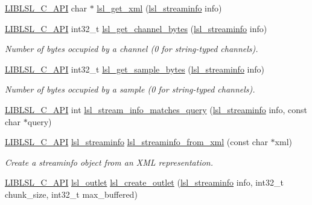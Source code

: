 \begin{DoxyCompactItemize}
\item 
\hyperlink{lsl__cpp_8h_aafd0ef1813e8be84a1420c4f1df64615}{L\+I\+B\+L\+S\+L\+\_\+\+C\+\_\+\+A\+PI} char $\ast$ \hyperlink{namespacelsl_ad1a9b14dccf565e5ecb79c093fe0fd39}{lsl\+\_\+get\+\_\+xml} (\hyperlink{namespacelsl_aa0a9ce9956061679949daa2e35aae2e8}{lsl\+\_\+streaminfo} info)
\item 
\hyperlink{lsl__cpp_8h_aafd0ef1813e8be84a1420c4f1df64615}{L\+I\+B\+L\+S\+L\+\_\+\+C\+\_\+\+A\+PI} int32\+\_\+t \hyperlink{namespacelsl_aa11d6865aa57caf51f5d13c66a785b30}{lsl\+\_\+get\+\_\+channel\+\_\+bytes} (\hyperlink{namespacelsl_aa0a9ce9956061679949daa2e35aae2e8}{lsl\+\_\+streaminfo} info)
\begin{DoxyCompactList}\small\item\em Number of bytes occupied by a channel (0 for string-\/typed channels). \end{DoxyCompactList}\item 
\hyperlink{lsl__cpp_8h_aafd0ef1813e8be84a1420c4f1df64615}{L\+I\+B\+L\+S\+L\+\_\+\+C\+\_\+\+A\+PI} int32\+\_\+t \hyperlink{namespacelsl_a26e8a9f4b8c7ee128362aadbc688dab0}{lsl\+\_\+get\+\_\+sample\+\_\+bytes} (\hyperlink{namespacelsl_aa0a9ce9956061679949daa2e35aae2e8}{lsl\+\_\+streaminfo} info)
\begin{DoxyCompactList}\small\item\em Number of bytes occupied by a sample (0 for string-\/typed channels). \end{DoxyCompactList}\item 
\hyperlink{lsl__cpp_8h_aafd0ef1813e8be84a1420c4f1df64615}{L\+I\+B\+L\+S\+L\+\_\+\+C\+\_\+\+A\+PI} int \hyperlink{namespacelsl_a5c10ba1783b34bd0b3f048ac4cb5fe5e}{lsl\+\_\+stream\+\_\+info\+\_\+matches\+\_\+query} (\hyperlink{namespacelsl_aa0a9ce9956061679949daa2e35aae2e8}{lsl\+\_\+streaminfo} info, const char $\ast$query)
\item 
\hyperlink{lsl__cpp_8h_aafd0ef1813e8be84a1420c4f1df64615}{L\+I\+B\+L\+S\+L\+\_\+\+C\+\_\+\+A\+PI} \hyperlink{namespacelsl_aa0a9ce9956061679949daa2e35aae2e8}{lsl\+\_\+streaminfo} \hyperlink{namespacelsl_a2cf7fb16bf4029ca632fa5dab930de47}{lsl\+\_\+streaminfo\+\_\+from\+\_\+xml} (const char $\ast$xml)
\begin{DoxyCompactList}\small\item\em Create a streaminfo object from an X\+ML representation. \end{DoxyCompactList}\item 
\hyperlink{lsl__cpp_8h_aafd0ef1813e8be84a1420c4f1df64615}{L\+I\+B\+L\+S\+L\+\_\+\+C\+\_\+\+A\+PI} \hyperlink{namespacelsl_abcf512b0f66dacf86c10b165995fd50b}{lsl\+\_\+outlet} \hyperlink{namespacelsl_a4c92219e56eec896266a36ae58426d4b}{lsl\+\_\+create\+\_\+outlet} (\hyperlink{namespacelsl_aa0a9ce9956061679949daa2e35aae2e8}{lsl\+\_\+streaminfo} info, int32\+\_\+t chunk\+\_\+size, int32\+\_\+t max\+\_\+buffered)

\end{DoxyCompactItemize}
